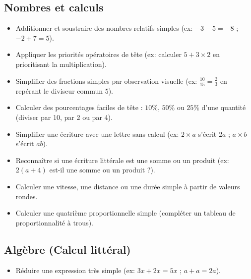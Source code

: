 \documentclass[11pt,a4paper]{article}
\begin{document}
\subsection*{Nombres et calculs}
\begin{itemize}[label=,leftmargin=*]
    \item Additionner et soustraire des nombres relatifs simples (ex: $-3 - 5 = -8$ ; $-2 + 7 = 5$).
    \item Appliquer les priorités opératoires de tête (ex: calculer $5 + 3 \times 2$ en prioritisant la multiplication).
    \item Simplifier des fractions simples par observation visuelle (ex: $\frac{10}{15} = \frac{2}{3}$ en repérant le diviseur commun 5).
    \item Calculer des pourcentages faciles de tête : $10\%$, $50\%$ ou $25\%$ d'une quantité (diviser par 10, par 2 ou par 4).
    \item Simplifier une écriture avec une lettre sans calcul (ex: $2 \times a$ s'écrit $2a$ ; $a \times b$ s'écrit $ab$).
    \item Reconnaître si une écriture littérale est une somme ou un produit (ex: $2(a+4)$ est-il une somme ou un produit ?).
    \item Calculer une vitesse, une distance ou une durée simple à partir de valeurs rondes.
    \item Calculer une quatrième proportionnelle simple (compléter un tableau de proportionnalité à trous).
\end{itemize}

\subsection*{Algèbre (Calcul littéral)}
\begin{itemize}[label=,leftmargin=*]
    \item Réduire une expression très simple (ex: $3x + 2x = 5x$ ; $a + a = 2a$).
\end{itemize}
\end{document}
